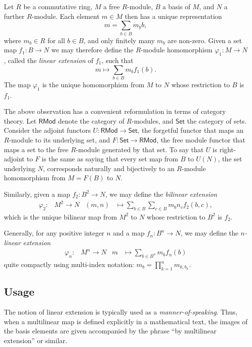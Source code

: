 \documentclass[12pt]{article}
\newcommand{\<}{\langle}
\renewcommand{\>}{\rangle}
\newcommand{\Prod}{\prod\limits}
\newcommand{\Sum}{\sum\limits}
\newcommand{\Set}{\mathsf{Set}}
\newcommand{\RMod}{\mathsf{RMod}}
\begin{document}
Let $R$ be a commutative ring, $M$ a free $R$-module, $B$ a basis of
$M$, and $N$ a further $R$-module. Each element $m\in M$ then has a
unique representation
\begin{equation*}
m=\Sum_{b\in B}m_b b,
\end{equation*}
where $m_b\in R$ for all $b\in B$, and only finitely many $m_b$ are
non-zero. Given a set map $f_1\colon B\to N$ we may therefore define the $R$-module homomorphism $\varphi_1 \colon M\to N$, called the \emph{linear extension} of $f_1$, such that
\[
 m \mapsto\Sum_{b\in B}m_bf_1(b).
\]
The map $\varphi_1$ is the unique homomorphism from $M$ to $N$ whose restriction to $B$ is $f_1$.   

The above observation has a convenient reformulation in terms of category theory.  Let $\RMod$ denote the category of $R$-modules, and $\Set$ the category of sets. Consider the adjoint functors $U\colon\RMod\to \Set$, the forgetful functor that maps an $R$-module to its underlying set, and $F \colon \Set \to \RMod$,
the free module functor that maps a set to the free $R$-module generated by that set.  To say that $U$ is right-adjoint to $F$ is the same as saying that every set map from $B$ to $U(N)$, the set underlying $N$, corresponds naturally and bijectively to an $R$-module homomorphism from $M=F(B)$ to $N$.

Similarly, given a map $f_2\colon B^2\to N$, we may define the
\emph{bilinear extension}
\begin{align*}
\varphi_2\colon&M^2\to N&(m,n)&\mapsto\Sum_{b\in B}\Sum_{c\in B}m_bn_cf_2(b,c),
\end{align*}
which is the unique bilinear map from $M^2$ to $N$ whose restriction
to $B^2$ is $f_2$.

Generally, for any positive integer $n$ and a map $f_n\colon B^n\to
N$, we may define the \emph{$n$-linear extension}
\begin{align*}
\varphi_n\colon&M^n\to N&m&\mapsto\Sum_{b\in B^n}m_bf_n(b)
\end{align*}
quite compactly using multi-index notation: $m_b=\Prod_{k=1}^nm_{k,b_k}$.

\subsection*{Usage}

The notion of linear extension is typically used as a
\emph{manner-of-speaking}. Thus, when a multilinear map is defined
explicitly in a mathematical text, the images of the basis elements
are given accompanied by the phrase ``by multilinear extension'' or
similar.
\end{document}
